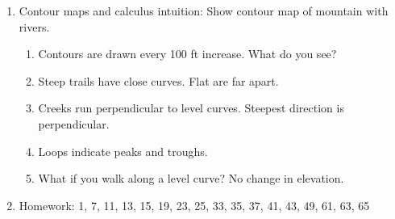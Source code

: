 \documentclass{article}
\begin{document}
\begin{enumerate}
\item Contour maps and calculus intuition: Show contour map of mountain with rivers.
\begin{enumerate}
\item Contours are drawn every 100 ft increase. What do you see?
\item Steep trails have close curves. Flat are far apart.
\item Creeks run perpendicular to level curves. Steepest direction is perpendicular.
\item Loops indicate peaks and troughs.
\item What if you walk along a level curve? No change in elevation.
\end{enumerate}

\item Homework: 1, 7, 11, 13, 15, 19, 23, 25, 33, 35, 37, 41, 43, 49, 61, 63, 65

\end{enumerate}
\end{document}
